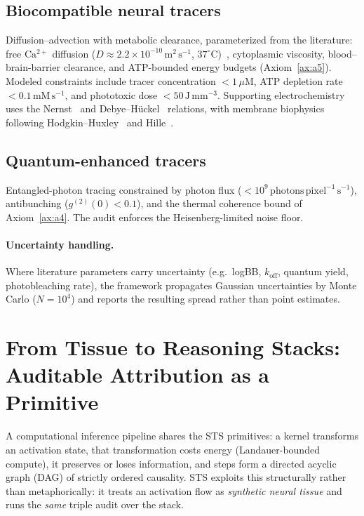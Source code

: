 \documentclass[11pt,a4paper]{article}
\begin{document}
\subsection{Biocompatible neural tracers}
Diffusion--advection with metabolic clearance, parameterized from the literature:
free $\mathrm{Ca^{2+}}$ diffusion ($D\approx 2.2\times10^{-10}\,\mathrm{m^2\,s^{-1}}$,
$37^{\circ}\mathrm{C}$)~\citep{einstein1905motion,fick1855diffusion}, cytoplasmic
viscosity, blood--brain-barrier clearance, and ATP-bounded energy budgets
(Axiom~\ref{ax:a5}). Modeled constraints include tracer concentration
$<1\,\mu\mathrm{M}$, ATP depletion rate $<0.1\,\mathrm{mM\,s^{-1}}$, and
phototoxic dose $<50\,\mathrm{J\,mm^{-3}}$. Supporting electrochemistry uses the
Nernst~\citep{nernst1888theory} and Debye--H\"uckel~\citep{debye1923theory}
relations, with membrane biophysics following
Hodgkin--Huxley~\citep{hodgkin1952quantitative} and Hille~\citep{hille2001ionic}.

\subsection{Quantum-enhanced tracers}
Entangled-photon tracing constrained by photon flux
($<10^9\,\mathrm{photons\,pixel^{-1}\,s^{-1}}$), antibunching
($g^{(2)}(0)<0.1$), and the thermal coherence bound of Axiom~\ref{ax:a4}. The
audit enforces the Heisenberg-limited noise floor.

\paragraph{Uncertainty handling.}
Where literature parameters carry uncertainty (e.g.\ logBB, $k_\mathrm{off}$,
quantum yield, photobleaching rate), the framework propagates Gaussian
uncertainties by Monte Carlo ($N=10^4$) and reports the resulting spread rather
than point estimates.

\section{From Tissue to Reasoning Stacks: Auditable Attribution as a Primitive}
\label{sec:bridge}

A computational inference pipeline shares the STS primitives: a kernel transforms
an activation state, that transformation costs energy (Landauer-bounded compute),
it preserves or loses information, and steps form a directed acyclic graph (DAG)
of strictly ordered causality. STS exploits this structurally rather than
metaphorically: it treats an activation flow as \emph{synthetic neural tissue} and
runs the \emph{same} triple audit over the stack.
\end{document}

